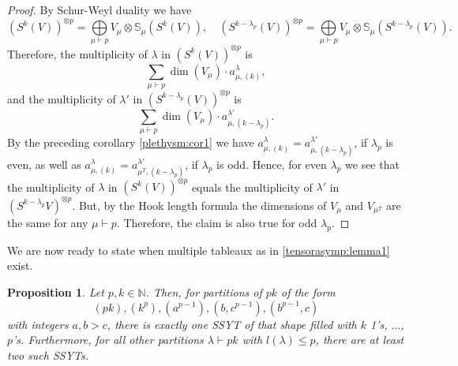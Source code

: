 \documentclass[a4paper]{amsart}
\newtheorem{proposition}{Proposition}
\def\N{{\mathbb{N}}}
\begin{document}
\begin{proof}
	By Schur-Weyl duality we have
	\begin{displaymath}
		(S^k(V))^{\otimes p}=
		\bigoplus\limits_{\mu\vdash p}V_\mu\otimes\mathbb{S}_\mu(S^k (V)),\quad
		(S^{k-\lambda_p}(V))^{\otimes p}=
		\bigoplus\limits_{\mu\vdash p}V_\mu\otimes\mathbb{S}_\mu(S^{k-\lambda_p} (V)).
	\end{displaymath}
	Therefore, the multiplicity of $\lambda$ in $(S^k (V))^{\otimes p}$ is
	\begin{displaymath}
		\sum\limits_{\mu\vdash p}\dim(V_\mu)\cdot a_{\mu,(k)}^\lambda,
	\end{displaymath}
	and the multiplicity of $\lambda'$ in $(S^{k-\lambda_p} (V))^{\otimes p}$ is
	\begin{displaymath}
		\sum\limits_{\mu\vdash p}\dim(V_\mu)\cdot a_{\mu,(k-\lambda_p)}^{\lambda'}.
	\end{displaymath}
	By the preceding corollary \cref{plethysm:cor1} we have $a_{\mu,(k)}^\lambda=a_{\mu,(k-\lambda_p)}^{\lambda'}$,
	if $\lambda_p$ is even,
	as well as $a_{\mu,(k)}^\lambda=a_{\mu^T,(k-\lambda_p)}^{\lambda'}$, if $\lambda_p$ is odd.
	Hence, for even $\lambda_p$ we see that the multiplicity of $\lambda$ in $(S^k (V))^{\otimes p}$
	equals the multiplicity of $\lambda'$ in $(S^{k-\lambda_p} V)^{\otimes p}$.
	But, by the Hook length formula \cite[4.12]{FH04} the dimensions of $V_\mu$ and $V_{\mu^T}$ are the same for any $\mu\vdash p$.
	Therefore, the claim is also true for odd $\lambda_p$.
\end{proof}
We are now ready to state when multiple tableaux as in \cref{tensorasymp:lemma1} exist.
\begin{proposition}\label{tensorasymp:prop1}
	Let $p,k\in\N$.
	Then, for partitions of $pk$ of the form 
	\begin{displaymath}
	(pk),(k^{p}),(a^{p-1}),(b,c^{p-1}),(b^{p-1},c)
	\end{displaymath}
	with integers $a, b>c$,
	there is exactly one SSYT of that shape filled with $k$ 1's, $\ldots$, $p$'s.
	Furthermore, for all other partitions $\lambda\vdash pk$ with $l(\lambda)\leq p$, there are at least two such SSYTs.
\end{proposition}
\end{document}
